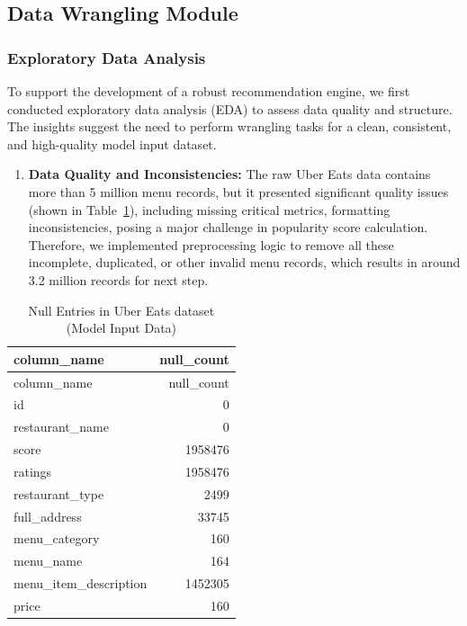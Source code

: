 \documentclass[
  11pt,
  a4paper,
  DIV=11,
  numbers=noendperiod]{scrartcl}
\providecommand{\tightlist}{%
  \setlength{\itemsep}{0pt}\setlength{\parskip}{0pt}}\usepackage{longtable,booktabs,array}
\begin{document}
\subsection{Data Wrangling Module}\label{data-wrangling-module}

\subsubsection{Exploratory Data
Analysis}\label{exploratory-data-analysis}

To support the development of a robust recommendation engine, we first
conducted exploratory data analysis (EDA) to assess data quality and
structure. The insights suggest the need to perform wrangling tasks for
a clean, consistent, and high-quality model input dataset.

\begin{enumerate}
\def\labelenumi{\arabic{enumi}.}
\tightlist
\item
  \textbf{Data Quality and Inconsistencies:} The raw Uber Eats data
  contains more than 5 million menu records, but it presented
  significant quality issues (shown in Table~\ref{tbl-null-entries}),
  including missing critical metrics, formatting inconsistencies, posing
  a major challenge in popularity score calculation. Therefore, we
  implemented preprocessing logic to remove all these incomplete,
  duplicated, or other invalid menu records, which results in around 3.2
  million records for next step.
\end{enumerate}

\begin{longtable}[]{@{}lr@{}}
\caption{Null Entries in Uber Eats dataset (Model Input
Data)}\label{tbl-null-entries}\tabularnewline
\toprule\noalign{}
column\_name & null\_count \\
\midrule\noalign{}
\endfirsthead
\toprule\noalign{}
column\_name & null\_count \\
\midrule\noalign{}
\endhead
\bottomrule\noalign{}
\endlastfoot
id & 0 \\
restaurant\_name & 0 \\
score & 1958476 \\
ratings & 1958476 \\
restaurant\_type & 2499 \\
full\_address & 33745 \\
menu\_category & 160 \\
menu\_name & 164 \\
menu\_item\_description & 1452305 \\
price & 160 \\
\end{longtable}
\end{document}
